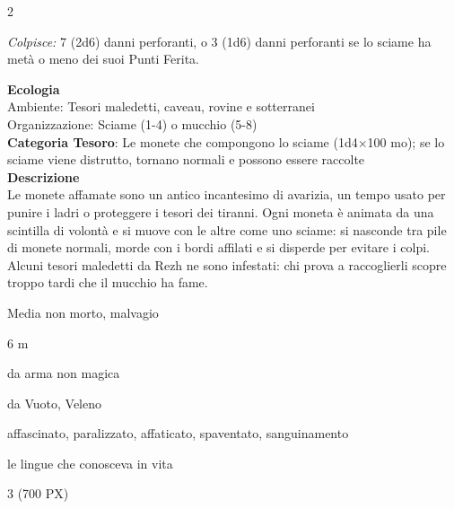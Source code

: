 \begin{multicols}{2}
{\emph{Colpisce:} 7 (2d6) danni perforanti, o 3 (1d6) danni perforanti se lo sciame ha metà o meno dei suoi Punti Ferita.

\textbf{Ecologia}\\
Ambiente: Tesori maledetti, caveau, rovine e sotterranei\\
Organizzazione: Sciame (1-4) o mucchio (5-8)\\
\textbf{Categoria Tesoro}: Le monete che compongono lo sciame (1d4×100 mo); se lo sciame viene distrutto, tornano normali e possono essere raccolte\\
\textbf{Descrizione}\\
Le monete affamate sono un antico incantesimo di avarizia, un tempo usato per punire i ladri o proteggere i tesori dei tiranni. Ogni moneta è animata da una scintilla di volontà e si muove con le altre come uno sciame: si nasconde tra pile di monete normali, morde con i bordi affilati e si disperde per evitare i colpi. Alcuni tesori maledetti da Rezh ne sono infestati: chi prova a raccoglierli scopre troppo tardi che il mucchio ha fame.

\begin{description}[noitemsep, topsep=0pt, parsep=0pt, partopsep=0pt, itemsep=1pt, leftmargin=2.35cm,  labelwidth=2.2cm, itemindent=0cm, listparindent=0pt] %
\setlength{\baselineskip}{10pt}
\item[\textbf{Taglia/Tipo}] Media non morto, malvagio
\item[\textbf{Caratt.}] 
\item[\textbf{Punti Ferita}] 
\item[\textbf{Movimento}] 6 m
\item[\textbf{Tiri Salvez.}] 
\item[\textbf{Res. Danni}] da arma non magica
\item[\textbf{Imm. Danni}] da Vuoto, Veleno
\item[\textbf{Immunità}] affascinato, paralizzato, affaticato, spaventato, sanguinamento
\item[\textbf{Sensi}] 
\item[\textbf{Linguaggi}] le lingue che conosceva in vita
\item[\textbf{Sfida}] 3 (700 PX)
\end{description}
\smallskip

}
\end{multicols}
